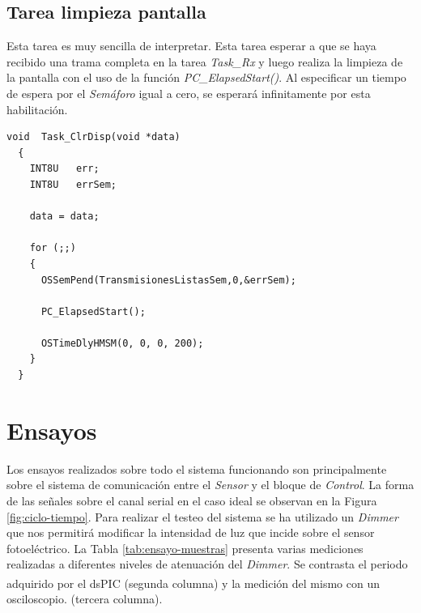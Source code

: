 \documentclass[11pt,a4paper,oneside]{article}
\begin{document}
\subsection{Tarea limpieza pantalla}
\label{sec:limpieza-pantalla}

Esta tarea es muy sencilla de interpretar. Esta tarea esperar a que se haya recibido una trama completa en la tarea \emph{Task\_Rx} y luego realiza la limpieza de la pantalla con el uso de la función \emph{PC\_ElapsedStart()}. Al especificar un tiempo de espera por el \emph{Semáforo} igual a cero, se esperará infinitamente por esta habilitación.

\begin{lstlisting}[caption={Tarea de limpieza de pantalla (\emph{Task\_ClrDisp()})},label=code:pc-task-clrdisp]
  void  Task_ClrDisp(void *data)
  {
    INT8U	err;
    INT8U 	errSem;

    data = data;
    
    for (;;)
    {
      OSSemPend(TransmisionesListasSem,0,&errSem);

      PC_ElapsedStart();

      OSTimeDlyHMSM(0, 0, 0, 200);
    }
  }
\end{lstlisting}

\section{Ensayos}
\label{sec:ensayos}

Los ensayos realizados sobre todo el sistema funcionando son principalmente sobre el sistema de comunicación entre el \emph{Sensor} y el bloque de \emph{Control}. La forma de las señales sobre el canal serial en el caso ideal se observan en la Figura \ref{fig:ciclo-tiempo}. Para realizar el testeo del sistema se ha utilizado un \textsl{Dimmer} que nos permitirá modificar la intensidad de luz que incide sobre el sensor fotoeléctrico. La Tabla \ref{tab:ensayo-muestras} presenta varias mediciones realizadas a diferentes niveles de atenuación del \textsl{Dimmer}. Se contrasta el periodo adquirido por el dsPIC\textsuperscript{\textregistered} (segunda columna) y la medición del mismo con un osciloscopio. (tercera columna).
\end{document}
